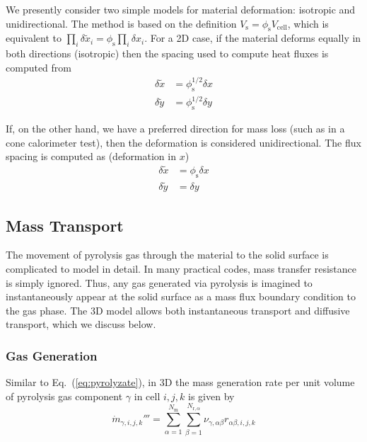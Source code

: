 {We presently consider two simple models for material deformation: isotropic and unidirectional.  The method is based on the definition $V_{\mathrm{s}}= \phi_{\mathrm{s}} V_{\mathrm{cell}}$, which is equivalent to $\prod_i \delta \tilde{x}_i = \phi_{\mathrm{s}} \prod_i \delta x_i$. For a 2D case, if the material deforms equally in both directions (isotropic) then the spacing used to compute heat fluxes is computed from
\begin{align}
\label{eq:dxdefiso}
\delta \tilde{x} &= \phi_{\mathrm{s}}^{1/2} \delta x \nonumber\\
\delta \tilde{y} &= \phi_{\mathrm{s}}^{1/2} \delta y
\end{align}

If, on the other hand, we have a preferred direction for mass loss (such as in a cone calorimeter test), then the deformation is considered unidirectional.  The flux spacing is computed as (deformation in $x$)
\begin{align}
\label{eq:dxdefuni}
\delta \tilde{x} &= \phi_{\mathrm{s}} \delta x \nonumber\\
\delta \tilde{y} &= \delta y
\end{align}

\subsection{Mass Transport}
\label{sec:mass_transport}

The movement of pyrolysis gas through the material to the solid surface is complicated to model in detail.  In many practical codes, mass transfer resistance is simply ignored.  Thus, any gas generated via pyrolysis is imagined to instantaneously appear at the solid surface as a mass flux boundary condition to the gas phase.  The 3D model allows both instantaneous transport and diffusive transport, which we discuss below.

\subsubsection*{Gas Generation}
\label{eq:gas_generation}

Similar to Eq.~(\ref{eq:pyrolyzate}), in 3D the mass generation rate per unit volume of pyrolysis gas component $\gamma$ in cell $i,j,k$ is given by
\begin{equation}
\label{eq:massprod}
\dot{m}_{\gamma,i,j,k}''' =  \sum_{\alpha=1}^{N_{\mathrm{m}}} \sum_{\beta=1}^{N_{\mathrm{r},\alpha}} \nu_{\gamma,\alpha\beta} r_{\alpha\beta,i,j,k}
\end{equation}

}
